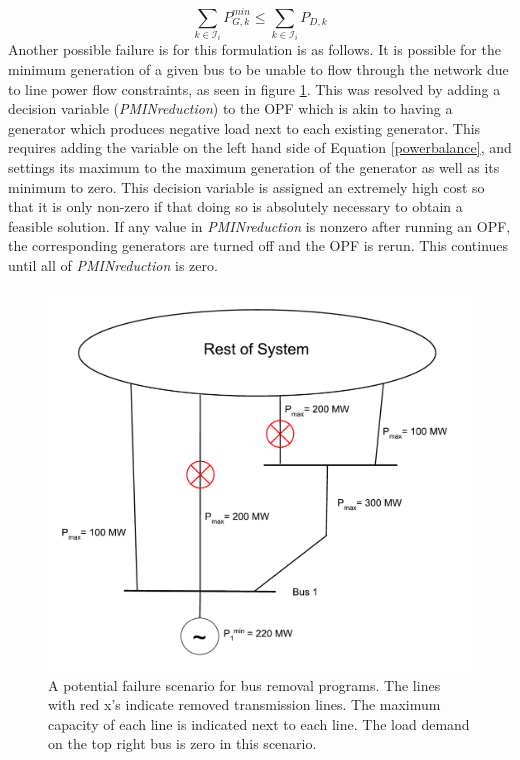 \documentclass[12pt]{article}
\begin{document}
\begin{equation}
    \sum_{k \in \mathcal{I}_i} P_{G, k}^{min} \leq \sum_{k \in \mathcal{I}_i} P_{D, k}
    \label{eq:pminfailone}
\end{equation}
Another possible failure is for this formulation is as follows. It is possible for the minimum generation of a given bus to be unable to flow through the network due to line power flow constraints, as seen in figure \ref{fig:pminfailtwo}. This was resolved by adding a decision variable (\textit{PMINreduction}) to the OPF which is akin to having a generator which produces negative load next to each existing generator. This requires adding the variable on the left hand side of Equation \eqref{powerbalance}, and settings its maximum to the maximum generation of the generator as well as its minimum to zero. This decision variable is assigned an extremely high cost so that it is only non-zero if that doing so is absolutely necessary to obtain a feasible solution. If any value in \textit{PMINreduction}  is nonzero after running an OPF, the corresponding generators are turned off and the OPF is rerun. This continues until all of \textit{PMINreduction} is zero. \par
\begin{figure}[ht]
    \centering %
    \includegraphics[width=\textwidth]{Pminbroken2.pdf}
    \caption[Potential failure scenario for bus removal programs]{A potential failure scenario for bus removal programs. The lines with red x’s indicate removed transmission lines. The maximum capacity of each line is indicated next to each line. The load demand on the top right bus is zero in this scenario.}
    \label{fig:pminfailtwo}
\end{figure}
\end{document}
